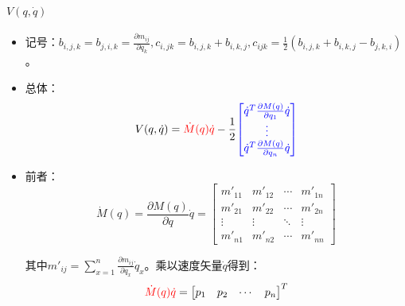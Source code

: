 \documentclass[
12pt, %
a4paper, 
oneside, %
headinclude,footinclude, %
]{scrartcl}
\begin{document}
\paragraph{$ V(q, \dot{q}) $}
\begin{itemize}
\item 记号：$ b_{i,j,k} = b_{j,i,k} = \frac{\partial m_{ij}}{\partial q_k}, c_{i,j k} = b_{i,j,k} + b_{i,k,j}, c_{ijk} = \frac{1}{2}(b_{i,j,k} + b_{i,k,j} - b_{j,k,i}) $。
\item 总体：
$$ V(q, \dot{q}) = \textcolor{red}{\dot{M}(q) \dot{q}} - \frac{1}{2}\textcolor{blue}{\begin{bmatrix} \dot{q}^T \frac{\partial M(q)}{\partial q_1}\dot{q} \\ \vdots \\ \dot{q}^T \frac{\partial M(q)}{\partial q_n}\dot{q} \end{bmatrix}} $$
\item 前者：
$$ \dot{M}(q) = \frac{\partial M(q)}{\partial q}\dot{q} = \begin{bmatrix} m'_{11} & m'_{12} & \cdots & m'_{1n} \\ m'_{21} & m'_{22} & \cdots & m'_{2n} \\ \vdots & \vdots & \ddots & \vdots \\ m'_{n1} & m'_{n2} & \cdots & m'_{nn} \end{bmatrix} $$

其中$ m'_{ij} = \sum_{x = 1}^n \frac{\partial m_{ij}}{\partial q_x}\dot{q}_x $。乘以速度矢量$ \dot{q} $得到：
$$ \textcolor{red}{\dot{M}(q) \dot{q}} = \begin{bmatrix} p_1 & p_2 & \cdots & p_n \end{bmatrix}^T $$


\end{itemize}
\end{document}
